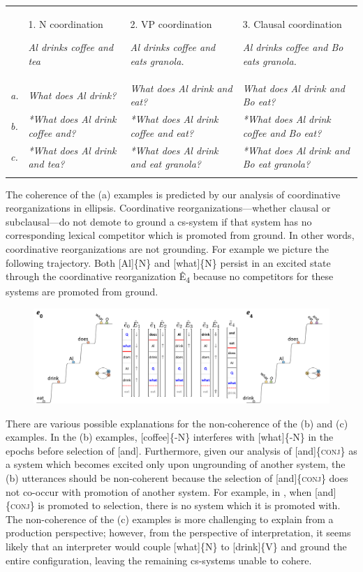 \begin{tabularx}{\textwidth}{XXXX}
\lsptoprule
& 1. N coordination

\textit{Al drinks coffee and tea} & 2. VP coordination

\textit{Al drinks coffee and eats granola.} & 3. Clausal coordination

\textit{Al drinks coffee and Bo eats granola.}\\
\textit{a.} & \textit{What does Al drink?} & \textit{What does Al drink and eat?} & \textit{What does Al drink and Bo eat?}\\
\textit{b.} & \textit{*What does Al drink coffee and?} & \textit{*What does Al drink coffee and eat?} & \textit{*What does Al drink coffee and Bo eat?}\\
\textit{c.} & \textit{*What does Al drink and tea?} & \textit{*What does Al drink and eat granola?} & \textit{*What does Al drink and Bo eat granola?}\\
\lspbottomrule
\end{tabularx}
  The coherence of the (a) examples is predicted by our analysis of coordinative reorganizations in ellipsis. Coordinative reorganizations—whether clausal or subclausal—do not demote to ground a cs-system if that system has no corresponding lexical competitor which is promoted from ground. In other words, coordinative reorganizations are not grounding. For example  we picture the following trajectory. Both [Al]\{N\} and [what]\{N\} persist in an excited state through the coordinative reorganization Ê\textsubscript{4} because no competitors for these systems are promoted from ground.

  
\begin{figure}
\includegraphics[width=\textwidth]{figures/Tilsen-img165.png}
\caption{\missingcaption}
\label{fig:}
\end{figure}
 

  There are various possible explanations for the non-coherence of the (b) and (c) examples. In the (b) examples, [coffee]\{-N\} interferes with [what]\{-N\} in the epochs before selection of [and]. Furthermore, given our analysis of [and]\{\textsc{conj}\} as a system which becomes excited only upon ungrounding of another system, the (b) utterances should be non-coherent because the selection of [and]\{\textsc{conj}\} does not co-occur with promotion of another system. For example, in , when [and]\{\textsc{conj}\} is promoted to selection, there is no system which it is promoted with. The non-coherence of the (c) examples is more challenging to explain from a production perspective; however, from the perspective of interpretation, it seems likely that an interpreter would couple [what]\{N\} to [drink]\{V\} and ground the entire configuration, leaving the remaining cs-systems unable to cohere.


